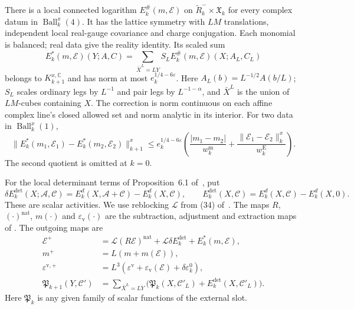 \documentclass[11pt,letterpaper,reqno]{amsart}
\newcommand{\C}{\mathbb C}
\newcommand{\extref}[2]{#1 of~\cite{#2}}
\newcommand{\exteq}[2]{(#1) of~\cite{#2}}
\begin{document}
\begin{theorem}
\begin{enumerate}[label=\textup{(\roman*)},leftmargin=*]
\end{enumerate}

There is a local connected logarithm $E_k^\#(m,\mathscr E)$ on
$\widetilde R_k^-\times\mathfrak X_k$ for every complex datum in
$\operatorname{Ball}_k^x(4)$. It has the lattice symmetry with
$LM$ translations, independent local real-gauge covariance and
charge conjugation. Each monomial is balanced; real data give the
reality identity. Its scaled sum
\[
 E_k^*(m,\mathscr E)(Y;A,C)
   =\sum_{\bar X^L=LY}S_LE_k^\#(m,\mathscr E)(X;A_L,C_L)
\]
belongs to $K_{k+1}^{x,\C}$ and has norm at most
$e_k^{1/4-6\varepsilon}$. Here $A_L(b)=L^{-1/2}A(b/L)$;
$S_L$ scales ordinary legs by $L^{-1}$ and pair legs by
$L^{-1-\alpha}$, and $\bar X^L$ is the union of $LM$-cubes
containing $X$. The correction is norm continuous on each affine
complex line's closed allowed set and norm analytic in its interior.
For two data in $\operatorname{Ball}_k^x(1)$,
\[
 \|E_k^*(m_1,\mathscr E_1)-E_k^*(m_2,\mathscr E_2)\|_{k+1}^x
 \le e_k^{1/4-6\varepsilon}
 \left(\frac{|m_1-m_2|}{w_k^{\mathrm m}}+
       \frac{\|\mathscr E_1-\mathscr E_2\|_k^x}{w_k^{\mathrm E}}\right).
\]
The second quotient is omitted at $k=0$.

For the local determinant terms of
Proposition~\extref{6.1}{FermionBlockManuscript}, put
\[
 \delta E_k^{\mathrm{det}}(X;\mathscr A,\mathscr C)
       =E_k^d(X,\mathscr A+\mathscr C)-E_k^d(X,\mathscr C),
 \qquad
 E_k^{\mathrm{det}}(X,\mathscr C)
       =E_k^d(X,\mathscr C)-E_k^d(X,0).
\]
These are scalar activities. We use reblocking
$\mathcal L$ from \exteq{34}{NormalizedContraction}.
The maps $R$, $(\cdot)^{\mathrm{nat}}$, $m(\cdot)$ and
$\varepsilon_{\mathrm v}(\cdot)$ are the subtraction, adjustment and
extraction maps of \cite[Theorem~A]{NormalizedContraction}.
The outgoing maps are
\begin{align}
 \mathscr E^+&=\mathcal L(R\mathscr E)^{\mathrm{nat}}
                        +\mathcal L\delta E_k^{\mathrm{det}}
                        +E_k^*(m,\mathscr E), \label{eq:rgnl-full-step}\\
 m^+&=L(m+m(\mathscr E)),\\
 \varepsilon^{\mathrm v,+}
       &=L^3(\varepsilon^{\mathrm v}
                  +\varepsilon_{\mathrm v}(\mathscr E)
                                      +\delta\varepsilon_k^0),\\
 \mathfrak P_{k+1}(Y,\mathscr C')
       &=\sum_{\bar X^L=LY}
           \big(\mathfrak P_k(X,\mathscr C'_L)
                          +E_k^{\mathrm{det}}(X,\mathscr C'_L)\big).
                                      \label{eq:rgnl-external-scalar-map}
\end{align}
Here $\mathfrak P_k$ is any given family of scalar
functions of the external slot.



\end{theorem}
\end{document}
